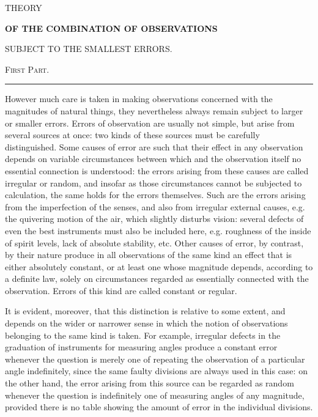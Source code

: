 \clearpage
{}
\begin{center}
{\large THEORY\par}
\medskip
{\Large\bfseries OF THE COMBINATION OF OBSERVATIONS\par}
\medskip
{\large SUBJECT TO THE SMALLEST ERRORS.\par}
\medskip
{\large\textsc{First Part.}\par}
\medskip
\rule{.22\linewidth}{.3pt}
\end{center}
However much care is taken in making observations concerned with the magnitudes of natural things, they nevertheless always remain subject to larger or smaller errors. Errors of observation are usually not simple, but arise from several sources at once: two kinds of these sources must be carefully distinguished. Some causes of error are such that their effect in any observation depends on variable circumstances between which and the observation itself no essential connection is understood: the errors arising from these causes are called irregular or random, and insofar as those circumstances cannot be subjected to calculation, the same holds for the errors themselves. Such are the errors arising from the imperfection of the senses, and also from irregular external causes, e.g. the quivering motion of the air, which slightly disturbs vision: several defects of even the best instruments must also be included here, e.g. roughness of the inside of spirit levels, lack of absolute stability, etc. Other causes of error, by contrast, by their nature produce in all observations of the same kind an effect that is either absolutely constant, or at least one whose magnitude depends, according to a definite law, solely on circumstances regarded as essentially connected with the observation. Errors of this kind are called constant or regular.

It is evident, moreover, that this distinction is relative to some extent, and depends on the wider or narrower sense in which the notion of observations belonging to the same kind is taken. For example, irregular defects in the graduation of instruments for measuring angles produce a constant error whenever the question is merely one of repeating the observation of a particular angle indefinitely, since the same faulty divisions are always used in this case: on the other hand, the error arising from this source can be regarded as random whenever the question is indefinitely one of measuring angles of any magnitude, provided there is no table showing the amount of error in the individual divisions.

